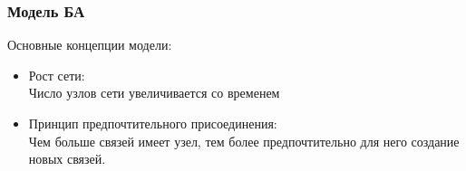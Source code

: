 \frametitle{Модель БА} 

Основные концепции модели:
\begin{itemize}[<+(1)->]
    \item Рост сети: \\ Число узлов сети увеличивается со временем
    \item Принцип предпочтительного присоединения:\\ Чем больше связей имеет узел, тем более предпочтительно для него создание новых связей.
\end{itemize}
